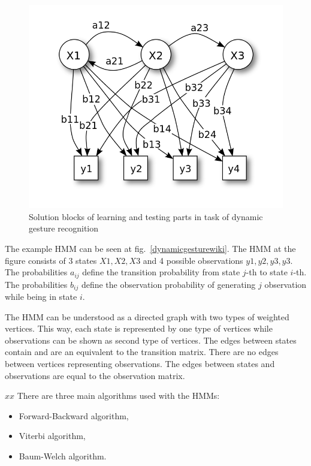 \begin{figure}[htb]
\centering
 \includegraphics[width=0.8\columnwidth]{figures/HMM_wiki.png}
 \caption[]{Solution blocks of learning and testing parts in task of dynamic gesture recognition\footnotemark}
 \label{dynamicgestureswiki}
\end{figure}


The example HMM can be seen at fig.~\ref{dynamicgesturewiki}.
The HMM at the figure consists of 3 states ${X1, X2, X3}$ and 4 possible observations ${y1, y2, y3, y3}$.
The probabilities $a_{ij}$ define the transition probability from state $j$-th to state $i$-th. 
The probabilities $b_{ij}$ define the observation probability of generating $j$ observation while being in state $i$.

The HMM can be understood as a directed graph with two types of weighted vertices. 
This way, each state is represented by one type of vertices while observations can be shown as second type of vertices.
The edges between states contain and are an equivalent to the transition matrix. 
There are no edges between vertices representing observations.
The edges between states and observations are equal to the observation matrix.

$ xx $
There are three main algorithms used with the HMMs:
\begin{itemize}
\item Forward-Backward algorithm, 
\item Viterbi algorithm,
\item Baum-Welch algorithm.
\end{itemize}

